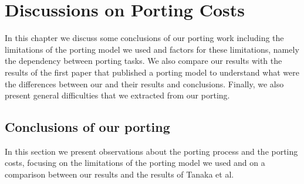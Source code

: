 \chapter{Discussions on Porting Costs} \label{sec:discussion}


%

In this chapter we discuss some conclusions of our porting work including the
limitations of the porting model we used and factors for these limitations,
namely the dependency between porting tasks. We also compare our results with
the results of the first paper that published a porting model to understand what
were the differences between our and their results and conclusions. Finally, we
also present general difficulties that we extracted from our porting.

\section{Conclusions of our porting}

In this section we present observations about the porting process and the
porting costs, focusing on the limitations of the porting model we used and on a
comparison between our results and the results of Tanaka et al.

